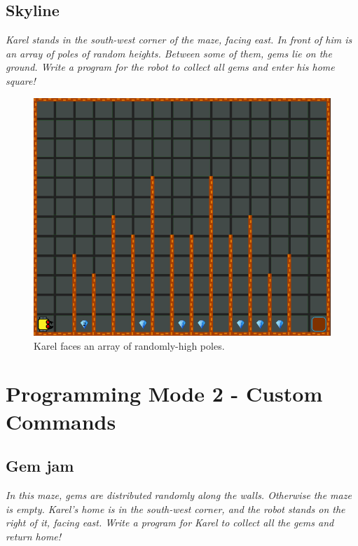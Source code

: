 \subsection{Skyline}

{\em Karel stands in the south-west corner of the maze, facing east. In front of him is an array of poles of random heights. Between some of them, gems lie on the ground. Write a program for the robot to collect all gems and enter his home square!}\\[-7mm]

\begin{figure}[!ht]
\begin{center}
\includegraphics[height=0.4\textwidth]{img/e04.png}
\end{center}
\vspace{-4mm}
\caption{Karel faces an array of randomly-high poles.}
\label{fig:e06}
\end{figure}


\section{Programming Mode 2 - Custom Commands}

\subsection{Gem jam}

{\em In this maze, gems are distributed randomly along the walls. Otherwise the maze is empty. Karel's home is in the south-west corner, and the robot stands on the right of it, facing east. Write a program for Karel to collect all the gems and return home!}
\newpage

